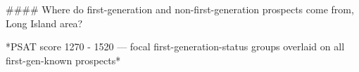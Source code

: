 #### Where do first-generation and non-first-generation prospects come from, Long Island area?

*PSAT score 1270 - 1520 — focal first-generation-status groups overlaid on all first-gen-known prospects*
